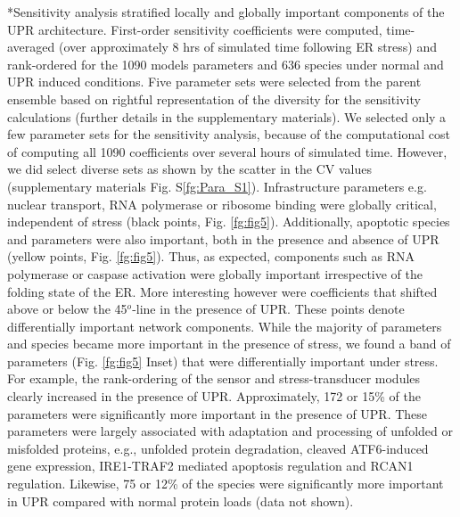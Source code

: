 \documentclass[12pt]{article}
\makeatletter
\renewcommand\subsection{\@startsection
	{subsection}{2}{0mm}
	{-0.05in}
	{-0.5\baselineskip}
	{\normalfont\normalsize\bfseries}}
\makeatother
\begin{document}
\subsection*{Sensitivity analysis stratified locally and globally important components of the UPR architecture.} 
First-order sensitivity coefficients were computed, time-averaged (over approximately 8 hrs of simulated time following ER stress) and rank-ordered for the 1090 models parameters and 636 species under normal and UPR induced conditions. Five parameter sets were selected from the parent ensemble based on rightful representation of the diversity for the sensitivity calculations (further details in the supplementary materials). We selected only a few parameter sets for the sensitivity analysis, because of the computational cost of computing all 1090 coefficients over several hours of simulated time. However, we did select diverse sets as shown by the scatter in the CV values (supplementary materials Fig. S\ref{fg:Para_S1}). Infrastructure parameters e.g. nuclear transport, RNA polymerase or ribosome binding were globally critical, independent of stress (black points, Fig. \ref{fg:fig5}). Additionally, apoptotic species and parameters were also important, both in the presence and absence of UPR (yellow points, Fig. \ref{fg:fig5}). Thus, as expected, components such as RNA polymerase or caspase activation were globally important irrespective of the folding state of the ER. More interesting however were coefficients that shifted above or below the 45$^{o}$-line in the presence of UPR. These points denote differentially important network components. While the majority of parameters and species became more important in the presence of stress, we found a band of parameters (Fig. \ref{fg:fig5} Inset) that were differentially important under stress. For example, the rank-ordering of the sensor and stress-transducer modules clearly increased in the presence of UPR. Approximately, 172 or 15\% of the parameters were significantly more important in the presence of UPR. These parameters were largely associated with adaptation and processing of unfolded or misfolded proteins, e.g., unfolded protein degradation, cleaved ATF6-induced gene expression, IRE1-TRAF2 mediated apoptosis regulation and RCAN1 regulation. Likewise, 75 or 12\% of the species were significantly more important in UPR compared with normal protein loads (data not shown).
\end{document}
